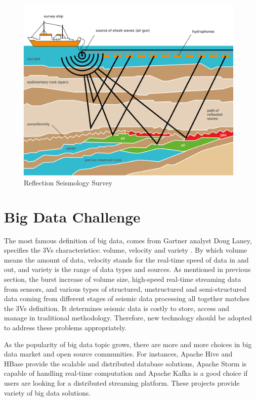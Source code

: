 \begin{figure}[h]
\centering
\includegraphics[scale=0.9]{figures/Seissurvey.jpg}
\caption{Reflection Seismology Survey \cite{seisaov}}
\label{seismic_reflection}
\end{figure}

\section{Big Data Challenge}

The most famous definition of big data, comes from Gartner analyst Doug Laney, specifies the 3Vs characteristics: volume, velocity and variety \cite{demauro2016}. By which volume means the amount of data, velocity stands for the real-time speed of data in and out, and variety is the range of data types and sources. As mentioned in previous section,  the burst increase of volume size, high-speed real-time streaming data from sensors, and various types of structured, unstructured and semi-structured data coming from different stages of seismic data processing all together matches the 3Vs definition. It determines seismic data is costly to store, access and manage in traditional methodology. Therefore, new technology should be adopted to address these problems appropriately.

As the popularity of big data topic grows, there are more and more choices in big data market and open source communities. For instances, Apache Hive and HBase provide the scalable and distributed database solutions,  Apache Storm is capable of handling real-time computation and Apache Kafka is a good choice if users are looking for a distributed streaming platform. These projects provide variety of big data solutions. 

